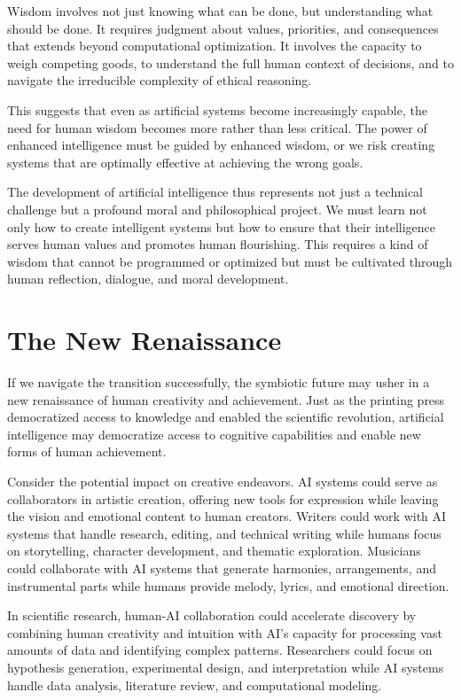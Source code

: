 Wisdom involves not just knowing what can be done, but understanding what should be done. It requires judgment about values, priorities, and consequences that extends beyond computational optimization. It involves the capacity to weigh competing goods, to understand the full human context of decisions, and to navigate the irreducible complexity of ethical reasoning.

This suggests that even as artificial systems become increasingly capable, the need for human wisdom becomes more rather than less critical. The power of enhanced intelligence must be guided by enhanced wisdom, or we risk creating systems that are optimally effective at achieving the wrong goals.

The development of artificial intelligence thus represents not just a technical challenge but a profound moral and philosophical project. We must learn not only how to create intelligent systems but how to ensure that their intelligence serves human values and promotes human flourishing. This requires a kind of wisdom that cannot be programmed or optimized but must be cultivated through human reflection, dialogue, and moral development.

\section{The New Renaissance}

If we navigate the transition successfully, the symbiotic future may usher in a new renaissance of human creativity and achievement. Just as the printing press democratized access to knowledge and enabled the scientific revolution, artificial intelligence may democratize access to cognitive capabilities and enable new forms of human achievement.

Consider the potential impact on creative endeavors. AI systems could serve as collaborators in artistic creation, offering new tools for expression while leaving the vision and emotional content to human creators. Writers could work with AI systems that handle research, editing, and technical writing while humans focus on storytelling, character development, and thematic exploration. Musicians could collaborate with AI systems that generate harmonies, arrangements, and instrumental parts while humans provide melody, lyrics, and emotional direction.

In scientific research, human-AI collaboration could accelerate discovery by combining human creativity and intuition with AI's capacity for processing vast amounts of data and identifying complex patterns. Researchers could focus on hypothesis generation, experimental design, and interpretation while AI systems handle data analysis, literature review, and computational modeling.


